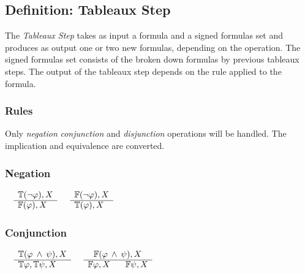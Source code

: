 \documentclass{article}
\begin{document}
	\subsection{Definition: Tableaux Step}
	The \textit{Tableaux Step} takes as input a formula and a signed formulas set and produces as output one or two new formulas, depending on the operation.
	The signed formulas set consists of the broken down formulas by previous tableaux steps.
	The output of the tableaux step depends on the rule applied to the formula.

	\subsubsection{Rules}
	Only \textit{negation} \textit{conjunction} and \textit{disjunction} operations will be handled. The implication and equivalence are converted.

		\subsubsection*{Negation}
			$\begin{array}{rl}
				& \mathbb{T}(\neg \varphi), X \\
			      \cline{2-2}
			      & \mathbb{F}(\varphi), X
			\end{array}$
			\:\:\:\:\:\:\:\:\:\:\:\:\:\:\:\:\:\:\:\:\:\:\:\:\:\:\:\:\:\:\:\:\:\:\:\:\:\:\:\:\:\:\:\:\:\:\:\:
			$\begin{array}{rl}
				& \mathbb{F}(\neg \varphi), X \\
			      \cline{2-2}
			      & \mathbb{T}(\varphi), X
			\end{array}$

		\subsubsection*{Conjunction}
			$\begin{array}{rl}
				& \mathbb{T}(\varphi \: \wedge \: \psi), X \\
			      \cline{2-2}
			      & \mathbb{T}\varphi, \mathbb{T}\psi, X
			\end{array}$
			\:\:\:\:\:\:\:\:\:\:\:\:\:\:\:\:\:\:\:\:\:\:\:\:\:\:\:\:\:\:\:\:\:\:\:
			$\begin{array}{rl}
				& \:\:\: \mathbb{F}(\varphi \: \wedge \: \psi), X \\
			      \cline{2-2}
			      & \mathbb{F}\varphi, X \:\:\:\:\:\:\:\: \mathbb{F}\psi, X
			\end{array}$
\end{document}
